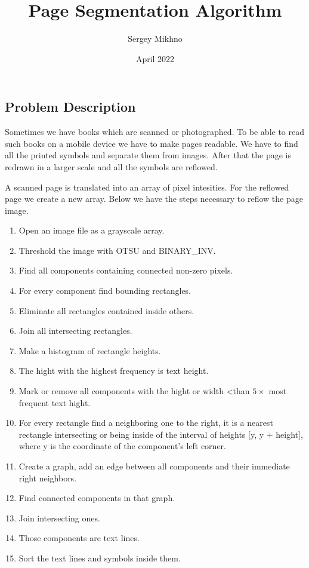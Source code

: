 \documentclass{article}
\title{Page Segmentation Algorithm}
\author{Sergey Mikhno}
\date{April 2022}
\begin{document}
\maketitle

\begin{multicols}{2}
\section{Problem Description}
Sometimes we have books which are scanned or photographed. To be able to read such books on a mobile device we have to make pages readable. We have to find all the printed symbols and separate them from images. After that the page is redrawn in a larger scale and all the symbols are reflowed.

A scanned page is translated into an array of pixel intesities. For the reflowed page we create a new array. Below we have the steps necessary to reflow the page image.

\begin{enumerate}
\item Open an image file as a grayscale array.
\item Threshold the image with OTSU and BINARY\_INV.
\item Find all components containing connected non-zero pixels.
\item For every component find bounding rectangles.
\item Eliminate all rectangles contained inside others.
\item Join all intersecting rectangles.
\item Make a histogram of rectangle heights.
\item The hight with the highest frequency is text height.
\item Mark or remove all components with the hight or width \textless than $ 5 \times $ most frequent text hight.
\item For every rectangle find a neighboring one to the right, it is a nearest rectangle  intersecting or being inside of the interval of heights [y, y + height], where y is the coordinate of the component's left corner.
\item Create a graph, add an edge between all components and their immediate right neighbors.
\item Find connected components in that graph.
\item Join intersecting ones.
\item Those components are text lines.
\item Sort the text lines and symbols inside them.
\end{enumerate}

\end{multicols}
	

	
\end{document}
